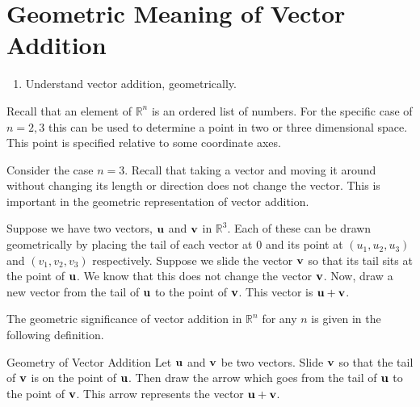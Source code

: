 \section{Geometric Meaning of Vector Addition}

\begin{outcome}

\begin{enumerate}
\item[A.] Understand vector addition, geometrically.
\end{enumerate}
\end{outcome}

Recall that an element of $\mathbb{R}^{n}$ is an ordered list of
numbers. For the specific case of $n=2,3$ this can be used to
determine a point in two or three dimensional space. This point is
specified relative to some coordinate axes.

Consider the case $n=3$. Recall that taking a vector and moving it
around without changing its length or direction does not change the
vector. This is important in the geometric representation of vector
addition.

Suppose we have two vectors, $\mathbf{u}$ and $\mathbf{v}$ in
$\mathbb{R}^{3}$. Each of these can be drawn geometrically by placing
the tail of each vector at $0$ and its point at $\left( u_{1}, u_{2},
u_{3}\right)$ and $\left( v_{1}, v_{2}, v_{3}\right) $
respectively. Suppose we slide the vector $\mathbf{v}$ so that its tail
sits at the point of $\mathbf{u}$.  We know that this does not change
the vector $\mathbf{v}$.  Now, draw a new vector from the tail of
$\mathbf{u}$ to the point of $\mathbf{v}$. This vector is
$\mathbf{u}+\mathbf{v}$.

The geometric significance of vector addition in $\mathbb{R}^n$ for any $n$ is given in
the following definition.

\begin{definition}{Geometry of Vector Addition}\label{def:geometryofvectoraddition}
Let $\mathbf{u}$ and $\mathbf{v}$ be two vectors. Slide $\mathbf{v}$ so that
the tail of $\mathbf{v}$ is on the point of $\mathbf{u}$. Then draw the
arrow which goes from the tail of $\mathbf{u}$ to the point of $\mathbf{v}$. 
This arrow represents the vector $\mathbf{u}+\mathbf{v}$.

\begin{center}
\par{}\label{fig:RnVectorsAdditionMeaning-tikz01}%

\end{center}
\end{definition}

